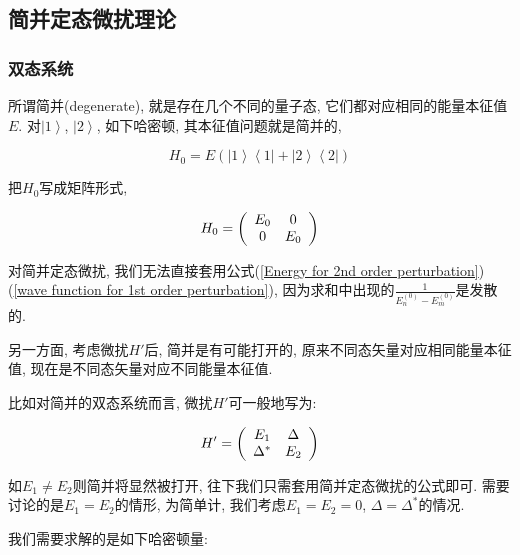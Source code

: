 \subsection{简并定态微扰理论}

\subsubsection{双态系统}

所谓简并(degenerate), 就是存在几个不同的量子态,
它们都对应相同的能量本征值$E$. 对$\left| 1 \right\rangle$, $\left| 2
\right\rangle$, 如下哈密顿, 其本征值问题就是简并的,

\begin{equation}\label{degenerate two state system}
H_0 = E \left( \left| 1 \right\rangle \left\langle 1 \right| +
\left| 2 \right\rangle \left\langle 2 \right| \right)
\end{equation}

把$H_0$写成矩阵形式,

\begin{equation*}
H_0 = \left( {\begin{array}{*{20}c}
   E_0 & 0  \\
   0 & E_0  \\
 \end{array} } \right)
\end{equation*}

对简并定态微扰, 我们无法直接套用公式(\ref{Energy for 2nd order
perturbation})(\ref{wave function for 1st order perturbation}),
因为求和中出现的$\frac{1}{E_n^{(0)}-E_m^{(0)}}$是发散的.

另一方面, 考虑微扰$H'$后, 简并是有可能打开的,
原来不同态矢量对应相同能量本征值,
现在是不同态矢量对应不同能量本征值.

比如对简并的双态系统而言, 微扰$H'$可一般地写为:

\begin{equation*}
H' = \left( {\begin{array}{*{20}c}
   E_1 & \Delta  \\
   \Delta^* & E_2  \\
 \end{array} } \right)
\end{equation*}

如$E_1 \ne E_2$则简并将显然被打开,
往下我们只需套用简并定态微扰的公式即可. 需要讨论的是$E_1 =
E_2$的情形, 为简单计, 我们考虑$E_1 = E_2 =0$, $\Delta =
\Delta^*$的情况.

我们需要求解的是如下哈密顿量:


